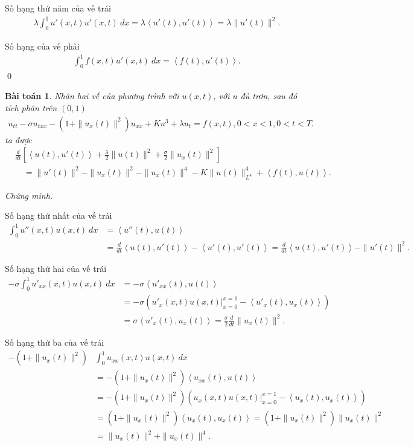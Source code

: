 \documentclass[12pt,a4paper]{article}
\newtheorem{theorem}{Bài toán}[section]
\theoremstyle{definition}
\begin{document}
Số hạng thứ năm của vế trái
\begin{align*}
    \lambda \int_0^1 u'(x,t) u'(x,t)\:dx = \lambda \left<u'(t),u'(t)\right> = \lambda \|u'(t)\|^2.
\end{align*}

Số hạng của vế phải
\begin{align*}
    \int_0^1 f(x,t) u'(x,t)\:dx = \left<f(t),u'(t)\right>.
\end{align*} \qed

\begin{theorem}
Nhân hai vế của phương trình với $u(x,t)$, với $u$ đủ trơn, sau đó tích phân trên $(0,1)$
\begin{align*}
    u_{tt} - \sigma u_{txx} - \left(1 + \|u_x(t)\|^2\right) u_{xx} + Ku^3 + \lambda u_t = f(x,t), 0 < x < 1, 0 < t < T.
\end{align*}
ta được
\begin{align*}
    &\frac{d}{dt}\left[\left<u(t),u'(t)\right> + \frac{\lambda}{2}\|u(t)\|^2 + \frac{\sigma}{2}\|u_x(t)\|^2\right] \\
    &\quad = \|u'(t)\|^2 - \|u_x(t)\|^2 - \|u_x(t)\|^4 - K\|u(t)\|^4_{L^4} + \left<f(t),u(t)\right>.
\end{align*}
\end{theorem}

\textit{Chứng minh.}

Số hạng thứ nhất của vế trái
\begin{align*}
    \int_0^1 u''(x,t) u(x,t)\:dx &= \left<u''(t),u(t)\right> \\
    &= \frac{d}{dt} \left<u(t), u'(t)\right> - \left<u'(t),u'(t)\right>
    = \frac{d}{dt} \left<u(t), u'(t)\right> - \|u'(t)\|^2.
\end{align*}

Số hạng thứ hai của vế trái
\begin{align*}
    -\sigma \int_0^1 u'_{xx}(x,t) u(x,t)\:dx
    &= -\sigma \left<u'_{xx}(t), u(t)\right> \\
    &= -\sigma \left(\left.u'_x(x,t)u(x,t)\right|_{x=0}^{x=1} - \left<u'_x(t), u_x(t)\right>\right) \\
    &= \sigma \left<u'_x(t), u_x(t)\right>
    = \frac{\sigma}{2} \frac{d}{dt} \|u_x(t)\|^2.
\end{align*}

Số hạng thứ ba của vế trái
\begin{align*}
    -\left(1 + \|u_x(t)\|^2\right) &\int_0^1 u_{xx}(x,t)u(x,t)\:dx \\
    &= - \left(1 + \|u_x(t)\|^2\right) \left<u_{xx}(t),u(t)\right> \\
    &= - \left(1 + \|u_x(t)\|^2\right) \left(\left.u_x(x,t)u(x,t)\right|_{x=0}^{x=1} - \left<u_x(t), u_x(t)\right>\right) \\
    &= \left(1 + \|u_x(t)\|^2\right) \left<u_x(t), u_x(t)\right>
    = \left(1 + \|u_x(t)\|^2\right) \|u_x(t)\|^2 \\
    &= \|u_x(t)\|^2 + \|u_x(t)\|^4.
\end{align*}
\end{document}
